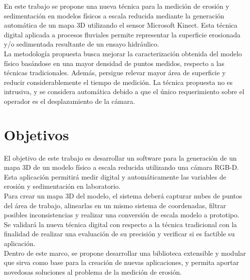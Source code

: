 En este trabajo se propone una nueva técnica para la medición de erosión y sedimentación en modelos físicos a escala reducida mediante la generación automática de un mapa 3D utilizando el sensor Microsoft Kinect. Esta técnica digital aplicada a procesos fluviales permite representar la superficie erosionada y/o sedimentada resultante de un ensayo hidráulico. \\
La metodología propuesta busca mejorar la caracterización obtenida del modelo físico basándose en una mayor densidad de puntos medidos, respecto a las técnicas tradicionales. Además, persigue relevar mayor área de superficie y reducir considerablemente el tiempo de medición. La técnica propuesta no es intrusiva, y se considera automática debido a que el único requerimiento sobre el operador es el desplazamiento de la cámara.

\section{Objetivos}
\label{sec:objetivos}

El objetivo de este trabajo es desarrollar un software para la generación de un mapa 3D de un modelo físico a escala reducida utilizando una cámara RGB-D. Esta aplicación permitirá medir digital y automáticamente las variables de erosión y sedimentación en laboratorio. \\
Para crear un mapa 3D del modelo, el sistema deberá capturar nubes de puntos del área de trabajo, alinearlas en un mismo sistema de coordenadas, filtrar posibles inconsistencias y realizar una conversión de escala modelo a prototipo. \\
Se validará la nueva técnica digital con respecto a la técnica tradicional con la finalidad de realizar una evaluación de su precisión y verificar si es factible su aplicación. \\
Dentro de este marco, se propone desarrollar una biblioteca extensible y modular que sirva como base para la creación de nuevas aplicaciones, y permita aportar novedosas soluciones al problema de la medición de erosión. \\